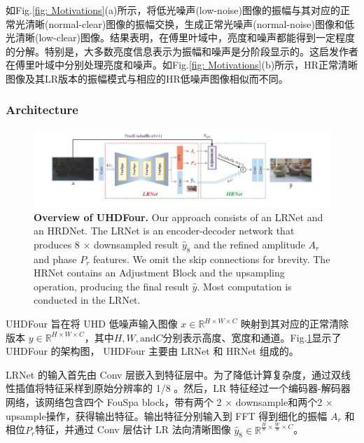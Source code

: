 \documentclass[letterpaper,10pt]{article}
\begin{document}
	如Fig.\ref{fig: Motivations}(a)所示，将低光噪声(low-noise)图像的振幅与其对应的正常光清晰(normal-clear)图像的振幅交换，生成正常光噪声(normal-noise)图像和低光清晰(low-clear)图像。结果表明，在傅里叶域中，亮度和噪声都能得到一定程度的分解。特别是，大多数亮度信息表示为振幅和噪声是分阶段显示的。这启发作者在傅里叶域中分别处理亮度和噪声。如Fig.\ref{fig: Motivations}(b)所示，HR正常清晰图像及其LR版本的振幅模式与相应的HR低噪声图像相似而不同。
	
	\subsubsection{Architecture}
		
	\begin{figure}[htbp]
		\centering 
		\includegraphics[width=0.8\columnwidth]{picture/UHDFour-architecture}
		\caption{
			\label{fig: UHDFour architecture} \textbf{Overview of UHDFour.} Our approach consists of an LRNet and an HRDNet. The LRNet is an encoder-decoder network that produces 8 $\times$ downsampled result $\hat{y}_{8}$ and the refined amplitude $A_{r}$ and phase $P_{r}$ features. We omit the skip connections for brevity. The HRNet contains an Adjustment Block and the upsampling operation, producing the final result $\hat{y}$. Most computation is conducted in the LRNet.
		}
	\end{figure}
	
	UHDFour 旨在将 UHD 低噪声输入图像 $x \in \mathbb{R}^{H \times W \times C}$ 映射到其对应的正常清除版本 $y \in \mathbb{R}^{H \times W \times C}$，其中$H, W, \text{and} C$分别表示高度、宽度和通道。Fig.\ref{fig: UHDFour architecture}显示了 UHDFour 的架构图， UHDFour 主要由 LRNet 和 HRNet 组成的。
	
	LRNet 的输入首先由 Conv 层嵌入到特征层中。为了降低计算复杂度，通过双线性插值将特征采样到原始分辨率的 1/8 。然后，LR 特征经过一个编码器-解码器网络，该网络包含四个 FouSpa block，带有两个 2 $\times$ downsample和两个2 $\times$ upsample操作，获得输出特征。输出特征分别输入到 FFT 得到细化的振幅 $A_r$ 和相位$P_r$特征，并通过 Conv 层估计 LR 法向清晰图像 $\hat{y}_8 \in \mathbb{R}^{\frac{H}{8} \times \frac{W}{8} \times C}$。
	
\end{document}
